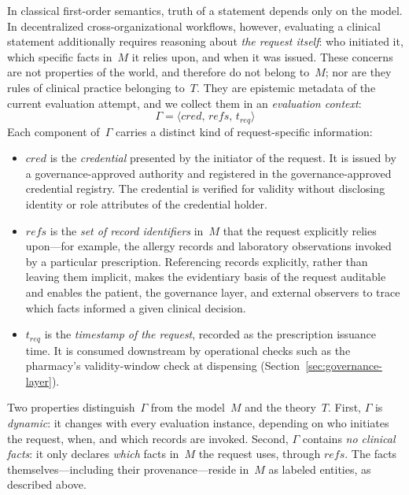 \documentclass[journal]{IEEEtran}
\begin{document}
In classical first-order semantics, truth of a statement depends
only on the model. In decentralized cross-organizational
workflows, however, evaluating a clinical statement additionally
requires reasoning about \emph{the request itself}: who initiated
it, which specific facts in~$M$ it relies upon, and when it was
issued. These concerns are not properties of the world, and
therefore do not belong to~$M$; nor are they rules of clinical
practice belonging to~$T$. They are epistemic metadata of the
current evaluation attempt, and we collect them in an
\emph{evaluation context}:
\begin{equation}\label{eq:ctx}
  \Gamma = \langle \mathit{cred},\, \mathit{refs},\,
                   \mathit{t_{req}} \rangle
\end{equation}
Each component of~$\Gamma$ carries a distinct kind of
request-specific information:
\begin{itemize}
\item $\mathit{cred}$ is the \emph{credential} presented by
    the initiator of the request. It is issued by a
    governance-approved authority and registered in the
    governance-approved credential registry. The credential
    is verified for validity without disclosing identity or
    role attributes of the credential holder.
  \item $\mathit{refs}$ is the \emph{set of record identifiers}
    in~$M$ that the request explicitly relies upon---for
    example, the allergy records and laboratory observations 
    invoked by a particular
    prescription. Referencing records explicitly, rather than
    leaving them implicit, makes the evidentiary basis of the
    request auditable and enables the patient, the governance
    layer, and external observers to trace which facts informed
    a given clinical decision.
  \item $\mathit{t_{req}}$ is the \emph{timestamp of the
    request}, recorded as the prescription issuance time.
    It is consumed downstream by operational checks such as
    the pharmacy's validity-window check at dispensing
    (Section~\ref{sec:governance-layer}).
\end{itemize}

Two properties distinguish~$\Gamma$ from the model~$M$ and the
theory~$T$. First, $\Gamma$ is \emph{dynamic}: it changes with
every evaluation instance, depending on who initiates the
request, when, and which records are invoked. Second, $\Gamma$
contains \emph{no clinical facts}: it only declares \emph{which}
facts in~$M$ the request uses, through $\mathit{refs}$. The
facts themselves---including their provenance---reside in~$M$
as labeled entities, as described above.
\end{document}
